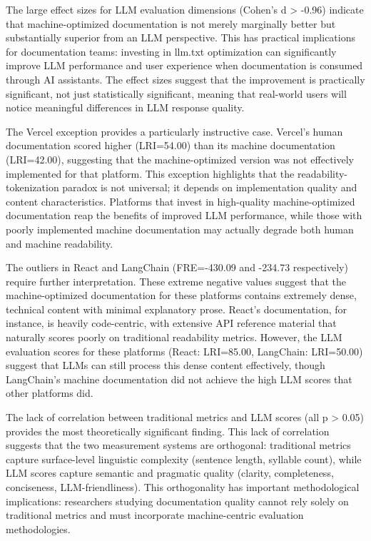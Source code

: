 \documentclass[10pt,conference,a4paper]{IEEEtran}
\begin{document}
The large effect sizes for LLM evaluation dimensions (Cohen's d > -0.96) indicate that machine-optimized documentation is not merely marginally better but substantially superior from an LLM perspective. This has practical implications for documentation teams: investing in llm.txt optimization can significantly improve LLM performance and user experience when documentation is consumed through AI assistants. The effect sizes suggest that the improvement is practically significant, not just statistically significant, meaning that real-world users will notice meaningful differences in LLM response quality.

The Vercel exception provides a particularly instructive case. Vercel's human documentation scored higher (LRI=54.00) than its machine documentation (LRI=42.00), suggesting that the machine-optimized version was not effectively implemented for that platform. This exception highlights that the readability-tokenization paradox is not universal; it depends on implementation quality and content characteristics. Platforms that invest in high-quality machine-optimized documentation reap the benefits of improved LLM performance, while those with poorly implemented machine documentation may actually degrade both human and machine readability.

The outliers in React and LangChain (FRE=-430.09 and -234.73 respectively) require further interpretation. These extreme negative values suggest that the machine-optimized documentation for these platforms contains extremely dense, technical content with minimal explanatory prose. React's documentation, for instance, is heavily code-centric, with extensive API reference material that naturally scores poorly on traditional readability metrics. However, the LLM evaluation scores for these platforms (React: LRI=85.00, LangChain: LRI=50.00) suggest that LLMs can still process this dense content effectively, though LangChain's machine documentation did not achieve the high LLM scores that other platforms did.

The lack of correlation between traditional metrics and LLM scores (all p > 0.05) provides the most theoretically significant finding. This lack of correlation suggests that the two measurement systems are orthogonal: traditional metrics capture surface-level linguistic complexity (sentence length, syllable count), while LLM scores capture semantic and pragmatic quality (clarity, completeness, conciseness, LLM-friendliness). This orthogonality has important methodological implications: researchers studying documentation quality cannot rely solely on traditional metrics and must incorporate machine-centric evaluation methodologies.
\end{document}
